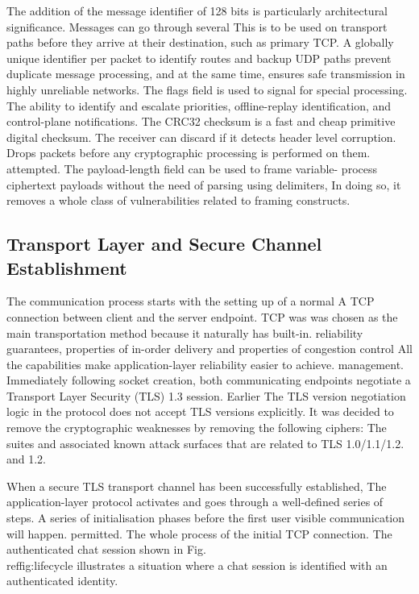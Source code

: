 \documentclass[conference]{IEEEtran}
\begin{document}
The addition of the message identifier of 128 bits is particularly
architectural significance.  Messages can go through several
This is to be used on transport paths before they arrive at their destination, such as primary TCP.
A globally unique identifier per packet to identify routes and backup UDP paths
prevent duplicate message processing, and at the same time, ensures
safe transmission in highly unreliable networks.  The flags
field is used to signal for special processing.
The ability to identify and escalate priorities, offline-replay identification,
and control-plane notifications.  The CRC32 checksum is a fast and cheap primitive digital checksum.
The receiver can discard if it detects header level corruption.
Drops packets before any cryptographic processing is performed on them.
attempted.  The payload-length field can be used to frame variable-
process ciphertext payloads without the need of parsing using delimiters,
In doing so, it removes a whole class of vulnerabilities related to framing constructs.

\subsection{Transport Layer and Secure Channel Establishment}

The communication process starts with the setting up of a normal
A TCP connection between client and the server endpoint.  TCP was
was chosen as the main transportation method because it naturally has built-in.
reliability guarantees, properties of in-order delivery and properties of congestion control
All the capabilities make application-layer reliability easier to achieve.
management.  Immediately following socket creation, both communicating
endpoints negotiate a Transport Layer Security (TLS) 1.3 session.  Earlier
The TLS version negotiation logic in the protocol does not accept TLS versions explicitly.
It was decided to remove the cryptographic weaknesses by removing the following ciphers:
The suites and associated known attack surfaces that are related to TLS 1.0/1.1/1.2.
and 1.2.

When a secure TLS transport channel has been successfully established,
The application-layer protocol activates and goes through a well-defined series of steps.
A series of initialisation phases before the first user visible communication will happen.
permitted.  The whole process of the initial TCP connection.
The authenticated chat session shown in Fig.~\\ref{fig:lifecycle} illustrates a situation where a chat session is identified with an authenticated identity.
\end{document}
